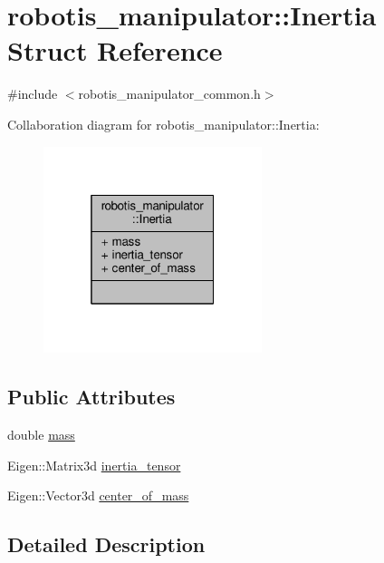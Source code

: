 \hypertarget{structrobotis__manipulator_1_1_inertia}{}\section{robotis\+\_\+manipulator\+:\+:Inertia Struct Reference}
\label{structrobotis__manipulator_1_1_inertia}


{\ttfamily \#include $<$robotis\+\_\+manipulator\+\_\+common.\+h$>$}



Collaboration diagram for robotis\+\_\+manipulator\+:\+:Inertia\+:\nopagebreak
\begin{figure}[H]
\begin{center}
\leavevmode
\includegraphics[width=181pt]{structrobotis__manipulator_1_1_inertia__coll__graph}
\end{center}
\end{figure}
\subsection*{Public Attributes}
\begin{DoxyCompactItemize}
\item 
double \hyperlink{structrobotis__manipulator_1_1_inertia_a8e25738415288febca11a62124736bab}{mass}
\item 
Eigen\+::\+Matrix3d \hyperlink{structrobotis__manipulator_1_1_inertia_a61b16b0ad0ac7366fe046b946c04c97e}{inertia\+\_\+tensor}
\item 
Eigen\+::\+Vector3d \hyperlink{structrobotis__manipulator_1_1_inertia_a8d7158602370b1abf0b690a6483376b7}{center\+\_\+of\+\_\+mass}
\end{DoxyCompactItemize}


\subsection{Detailed Description}


